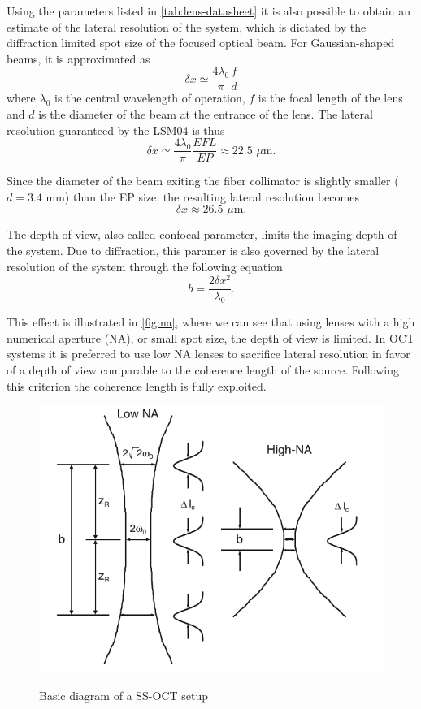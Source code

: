  Using the parameters listed in \autoref{tab:lens-datasheet} it is also possible to obtain an estimate of the lateral resolution of the system, which is dictated by the diffraction limited spot size of the focused optical beam. For Gaussian-shaped beams, it is approximated as \cite{Drexler2015}
 \begin{equation}
 	\delta x \simeq \frac{4\lambda_0}{\pi} \frac{f}{d}
 \end{equation}
 where $\lambda_0$ is the central wavelength of operation, $f$ is the focal length of the lens and $d$ is the diameter of the beam at the entrance of the lens. The lateral resolution guaranteed by the LSM04 is thus
 \begin{equation}\label{eq:transversal-resolution-theory}
 	\delta x \simeq \frac{4\lambda_0}{\pi} \frac{EFL}{EP} \approx 22.5 \,\,\mu\text{m.}
 \end{equation}
 
 Since the diameter of the beam exiting the fiber collimator is slightly smaller ($d=3.4$ mm) than the EP size, the resulting lateral resolution becomes
 \begin{equation}
	\delta x \approx 26.5 \,\,\mu\text{m}.
 \end{equation}
 
 The depth of view, also called confocal parameter, limits the imaging depth of the system. Due to diffraction, this paramer is also governed by the lateral resolution of the system through the following equation
 \begin{equation}
	 b = \frac{2 \delta x^2}{\lambda_0}.
 \end{equation}
 
 This effect is illustrated in \autoref{fig:na}, where we can see that using lenses with a high numerical aperture (NA), or small spot size, the depth of view is limited. In OCT systems it is preferred to use low NA lenses to sacrifice lateral resolution in favor of a depth of view comparable to the coherence length of the source. Following this criterion the coherence length is fully exploited. 
 
  \begin{figure}[bth]
 	\myfloatalign
 	{\includegraphics[width=0.6\linewidth]{gfx/ch3/na}}
 	\caption{Basic diagram of a  SS-OCT setup}\label{fig:na}
 \end{figure}
 
